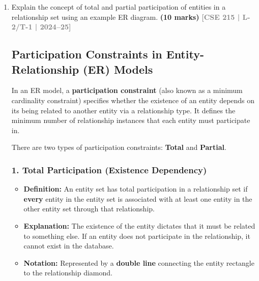 \documentclass[12pt,a3paper]{article}
\newcommand{\yr}[1]{\hfill\textcolor{gray}{\small\textbf{[#1]}}}
\newcommand{\mk}[1]{\textcolor{orange!70!black}{\small\textbf{(#1 marks)}}}
\begin{document}
\begin{enumerate}
\begin{tcolorbox}[enhanced,breakable,ansbox,colback=cA!4,colframe=cA,boxrule=0.8pt,arc=5pt,title={\textbf{Answer}},fonttitle=\bfseries\color{white},colbacktitle=cA]
\end{tcolorbox}

\item Explain the concept of total and partial participation of entities in a relationship set using an example ER diagram.
\mk{10} \yr{CSE 215 | L-2/T-1 | 2024--25}

\begin{tcolorbox}[enhanced,breakable,ansbox,colback=cA!4,colframe=cA,boxrule=0.8pt,arc=5pt,title={\textbf{Answer}},fonttitle=\bfseries\color{white},colbacktitle=cA]

\subsection*{Participation Constraints in Entity-Relationship (ER) Models}

In an ER model, a \textbf{participation constraint} (also known as a minimum cardinality constraint) specifies whether the existence of an entity depends on its being related to another entity via a relationship type. It defines the minimum number of relationship instances that each entity must participate in. 

There are two types of participation constraints: \textbf{Total} and \textbf{Partial}.

\subsubsection*{1. Total Participation (Existence Dependency)}
\begin{itemize}
    \item \textbf{Definition:} An entity set has total participation in a relationship set if \textbf{every} entity in the entity set is associated with at least one entity in the other entity set through that relationship.
    \item \textbf{Explanation:} The existence of the entity dictates that it must be related to something else. If an entity does not participate in the relationship, it cannot exist in the database.
    \item \textbf{Notation:} Represented by a \textbf{double line} connecting the entity rectangle to the relationship diamond.
\end{itemize}


\end{tcolorbox}
\end{enumerate}
\end{document}
